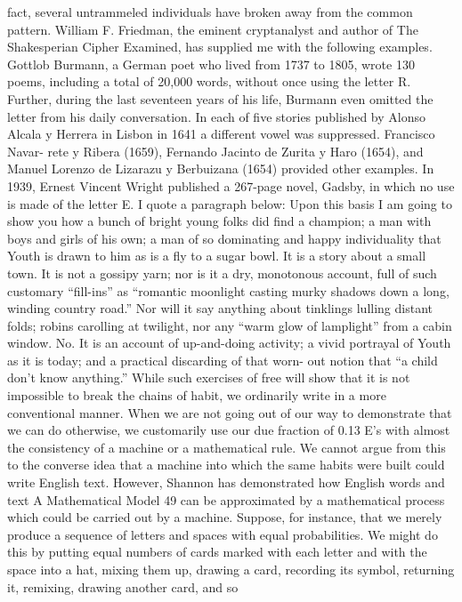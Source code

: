 fact, several untrammeled individuals have broken away from the
common pattern. William F. Friedman, the eminent cryptanalyst
and author of The Shakesperian Cipher Examined, has supplied
me with the following examples.
Gottlob Burmann, a German poet who lived from 1737 to 1805,
wrote 130 poems, including a total of 20,000 words, without once
using the letter R. Further, during the last seventeen years of his
life, Burmann even omitted the letter from his daily conversation.
In each of five stories published by Alonso Alcala y Herrera in
Lisbon in 1641 a different vowel was suppressed. Francisco Navar-
rete y Ribera (1659), Fernando Jacinto de Zurita y Haro (1654),
and Manuel Lorenzo de Lizarazu y Berbuizana (1654) provided
other examples.
In 1939, Ernest Vincent Wright published a 267-page novel,
Gadsby, in which no use is made of the letter E. I quote a paragraph
below:
Upon this basis I am going to show you how a bunch of bright young
folks did find a champion; a man with boys and girls of his own; a man
of so dominating and happy individuality that Youth is drawn to him as
is a fly to a sugar bowl. It is a story about a small town. It is not a gossipy
yarn; nor is it a dry, monotonous account, full of such customary “fill-ins”
as “romantic moonlight casting murky shadows down a long, winding
country road.” Nor will it say anything about tinklings lulling distant
folds; robins carolling at twilight, nor any “warm glow of lamplight” from
a cabin window. No. It is an account of up-and-doing activity; a vivid
portrayal of Youth as it is today; and a practical discarding of that worn-
out notion that “a child don’t know anything.”
While such exercises of free will show that it is not impossible
to break the chains of habit, we ordinarily write in a more conventional
manner. When we are not going out of our way to demonstrate
that we can do otherwise, we customarily use our due
fraction of 0.13 E’s with almost the consistency of a machine or a
mathematical rule.
We cannot argue from this to the converse idea that a machine
into which the same habits were built could write English text.
However, Shannon has demonstrated how English words and text
A Mathematical Model 49
can be approximated by a mathematical process which could be
carried out by a machine.
Suppose, for instance, that we merely produce a sequence of
letters and spaces with equal probabilities. We might do this by
putting equal numbers of cards marked with each letter and with
the space into a hat, mixing them up, drawing a card, recording
its symbol, returning it, remixing, drawing another card, and so
